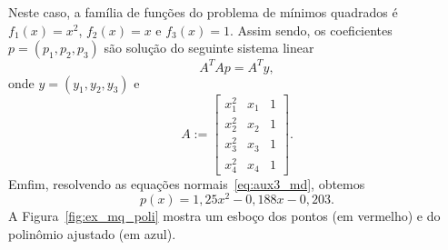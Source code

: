 \begin{ex}
  
  Neste caso, a família de funções do problema de mínimos quadrados é $f_1(x) = x^2$, $f_2(x) = x$ e $f_3(x) = 1$. Assim sendo, os coeficientes $p = (p_1, p_2, p_3)$ são solução do seguinte sistema linear
  \begin{equation}\label{eq:aux3_md}
    A^TAp = A^Ty,
  \end{equation}
  onde $y = (y_1, y_2, y_3)$ e
  \begin{equation}
    A :=
    \begin{bmatrix}
      x_1^2 & x_1 & 1 \\
      x_2^2 & x_2 & 1 \\
      x_3^2 & x_3 & 1 \\
      x_4^2 & x_4 & 1
    \end{bmatrix}.
  \end{equation}
  Emfim, resolvendo as equações normais~\eqref{eq:aux3_md}, obtemos
  \begin{equation}
    p(x) = 1,25x^2 -0,188x - 0,203.
  \end{equation}
  A Figura~\ref{fig:ex_mq_poli} mostra um esboço dos pontos (em vermelho) e do polinômio ajustado (em azul).
  


  
\end{ex}


